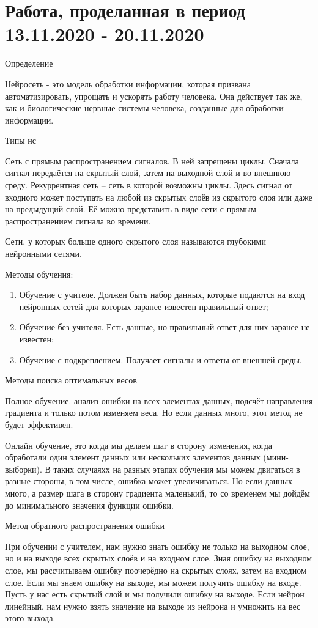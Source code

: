 \documentclass[12pt,a4paper]{report}
\begin{document}
	\section{Работа, проделанная в период 13.11.2020 - 20.11.2020}
	Определение 

Нейросеть  - это модель обработки информации, которая призвана автоматизировать, упрощать и ускорять работу человека. Она действует так же, как и биологические нервные системы человека, созданные для обработки информации. 

 Типы нс 

Сеть с прямым распространением сигналов. В ней запрещены циклы. Сначала сигнал передаётся на скрытый слой, затем на выходной слой и во внешнюю среду. Рекуррентная сеть – сеть в которой возможны циклы. Здесь сигнал от входного может поступать на любой из скрытых слоёв из скрытого слоя или даже на предыдущий слой. Её можно представить в виде сети с прямым распространением сигнала во времени. 

Сети, у которых больше одного скрытого слоя называются глубокими нейронными сетями. 

Методы обучения:
\begin{enumerate}
	\item Обучение с учителе. Должен быть набор данных, которые подаются на вход нейронных сетей для которых заранее известен правильный ответ;
	\item Обучение без учителя. Есть данные, но правильный ответ для них заранее не известен;
	\item Обучение с подкреплением. Получает сигналы и ответы от внешней среды.
\end{enumerate}


 Методы поиска оптимальных весов 

Полное обучение. анализ ошибки на всех элементах данных, подсчёт направления градиента и только потом изменяем веса. Но если данных много, этот метод не будет эффективен.  

Онлайн обучение, это когда мы делаем шаг в сторону изменения, когда обработали один элемент данных или нескольких элементов данных (мини-выборки). В таких случаяхх на разных этапах обучения мы можем двигаться в разные стороны, в том числе, ошибка может увеличиваться. Но если данных много, а размер шага в сторону градиента маленький, то со временем мы дойдём до минимального значения функции ошибки. 

 Метод обратного распространения ошибки 

При обучении с учителем, нам нужно знать ошибку не только на выходном слое, но и на выходе всех скрытых слоёв и на входном слое. Зная ошибку на выходном слое, мы рассчитываем ошибку поочерёдно на скрытых слоях, затем на входном слое. Если мы знаем ошибку на выходе, мы можем получить ошибку на входе. Пусть у нас есть скрытый слой и мы получили ошибку на выходе. Если нейрон линейный, нам нужно взять значение на выходе из нейрона и умножить на вес этого выхода.  
	
\end{document}

